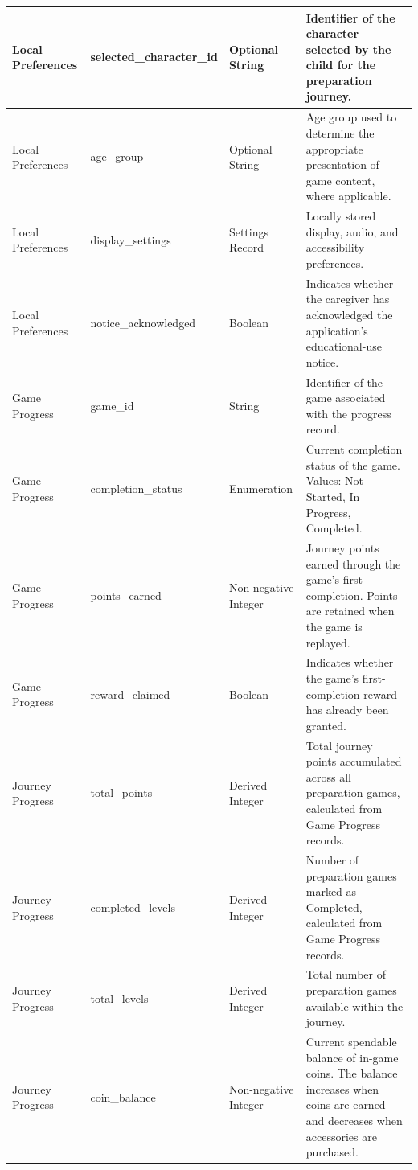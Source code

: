 \documentclass[12pt]{article}
\begin{document}
\begin{longtable}{
    p{}
    p{}
    p{}
    p{}
}
Local Preferences &
selected\_character\_id &
Optional String &
Identifier of the character selected by the child
for the preparation journey. \\
\midrule

Local Preferences &
age\_group &
Optional String &
Age group used to determine the appropriate
presentation of game content, where applicable. \\
\midrule

Local Preferences &
display\_settings &
Settings Record &
Locally stored display, audio, and accessibility
preferences. \\
\midrule

Local Preferences &
notice\_acknowledged &
Boolean &
Indicates whether the caregiver has acknowledged
the application's educational-use notice. \\
\midrule

Game Progress &
game\_id &
String &
Identifier of the game associated with the
progress record. \\
\midrule

Game Progress &
completion\_status &
Enumeration &
Current completion status of the game.
Values: Not Started, In Progress, Completed. \\
\midrule

Game Progress &
points\_earned &
Non-negative Integer &
Journey points earned through the game's
first completion. Points are retained
when the game is replayed. \\
\midrule

Game Progress &
reward\_claimed &
Boolean &
Indicates whether the game's first-completion
reward has already been granted. \\
\midrule

Journey Progress &
total\_points &
Derived Integer &
Total journey points accumulated across all
preparation games, calculated from Game
Progress records. \\
\midrule

Journey Progress &
completed\_levels &
Derived Integer &
Number of preparation games marked as
Completed, calculated from Game Progress
records. \\
\midrule

Journey Progress &
total\_levels &
Derived Integer &
Total number of preparation games available
within the journey. \\
\midrule

Journey Progress &
coin\_balance &
Non-negative Integer &
Current spendable balance of in-game coins.
The balance increases when coins are earned
and decreases when accessories are purchased. \\

\bottomrule

\end{longtable}
\end{document}
